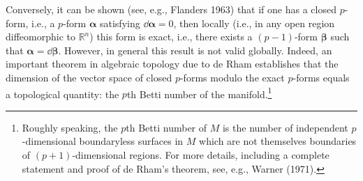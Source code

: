 Conversely, it can be shown (see, e.g., Flanders 1963) that if one has a closed
\(p\)-form, i.e., a \(p\)-form \(\boldsymbol\alpha\) satisfying
\(\dd\boldsymbol\alpha=0\), then locally (i.e., in any open region diffeomorphic to
\(\mathbb R^n\)) this form is exact, i.e., there exists a \((p-1)\)-form
\(\boldsymbol\beta\) such that \(\boldsymbol\alpha=\dd\boldsymbol\beta\). However, in
general this result is not valid globally. Indeed, an important theorem in algebraic
topology due to de Rham establishes that the dimension of the vector space of closed
\(p\)-forms modulo the exact \(p\)-forms equals a topological quantity: the \(p\)th
Betti number of the manifold.\footnote{Roughly speaking, the \(p\)th Betti number of
\(M\) is the number of independent \(p\)-dimensional boundaryless surfaces in \(M\)
which are not themselves boundaries of \((p+1)\)-dimensional regions. For more
details, including a complete statement and proof of de Rham's theorem, see, e.g.,
Warner (1971).}
